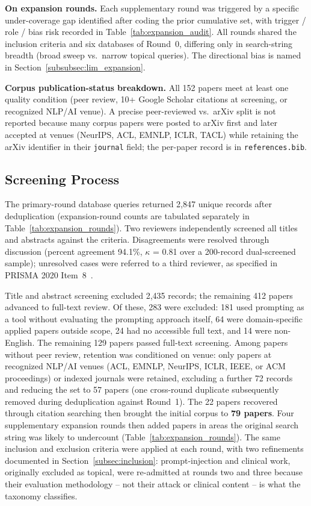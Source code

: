 \documentclass[acmsmall, nonacm, screen]{acmart}
\begin{document}
\textbf{On expansion rounds.} Each supplementary round was triggered
by a specific under-coverage gap identified after coding the prior
cumulative set, with trigger / role / bias risk recorded in
Table~\ref{tab:expansion_audit}. All rounds shared the inclusion
criteria and six databases of Round~0, differing only in
search-string breadth (broad sweep vs.\ narrow topical queries).
The directional bias is named in
Section~\ref{subsubsec:lim_expansion}.

\textbf{Corpus publication-status breakdown.} All 152 papers meet at
least one quality condition (peer review, 10+ Google Scholar
citations at screening, or recognized NLP/AI venue). A precise
peer-reviewed vs.\ arXiv split is not reported because many corpus
papers were posted to arXiv first and later accepted at venues
(NeurIPS, ACL, EMNLP, ICLR, TACL) while retaining the arXiv
identifier in their \texttt{journal} field; the per-paper record is
in \texttt{references.bib}.

\subsection{Screening Process}
\label{subsec:screening}

The primary-round database queries returned 2,847 unique records
after deduplication (expansion-round counts are tabulated separately
in Table~\ref{tab:expansion_rounds}). Two reviewers independently screened all titles and abstracts
against the criteria. Disagreements were resolved through discussion
(percent agreement 94.1\%, $\kappa$ = 0.81 over a 200-record
dual-screened sample); unresolved cases were
referred to a third reviewer, as specified in PRISMA 2020
Item~8~\cite{page2021prisma}.

Title and abstract screening excluded 2,435 records; the remaining
412 papers advanced to full-text review. Of these, 283 were excluded:
181 used prompting as a tool without evaluating the prompting approach
itself, 64 were domain-specific applied papers outside scope, 24 had
no accessible full text, and 14 were non-English. The remaining 129
papers passed full-text screening. Among papers without peer review,
retention was conditioned on venue: only papers at recognized NLP/AI
venues (ACL, EMNLP, NeurIPS, ICLR, IEEE, or ACM proceedings) or
indexed journals were retained, excluding a further 72 records and
reducing the set to 57 papers (one cross-round duplicate subsequently
removed during deduplication against Round~1).
The 22 papers recovered through citation searching then brought the
initial corpus to \textbf{79 papers}. Four supplementary expansion rounds then added
papers in areas the original search string was likely to undercount
(Table~\ref{tab:expansion_rounds}). The same inclusion and exclusion
criteria were applied at each round, with two refinements documented
in Section~\ref{subsec:inclusion}: prompt-injection and clinical
work, originally excluded as topical, were re-admitted at rounds two
and three because their evaluation methodology -- not their attack or
clinical content -- is what the taxonomy classifies.
\end{document}
